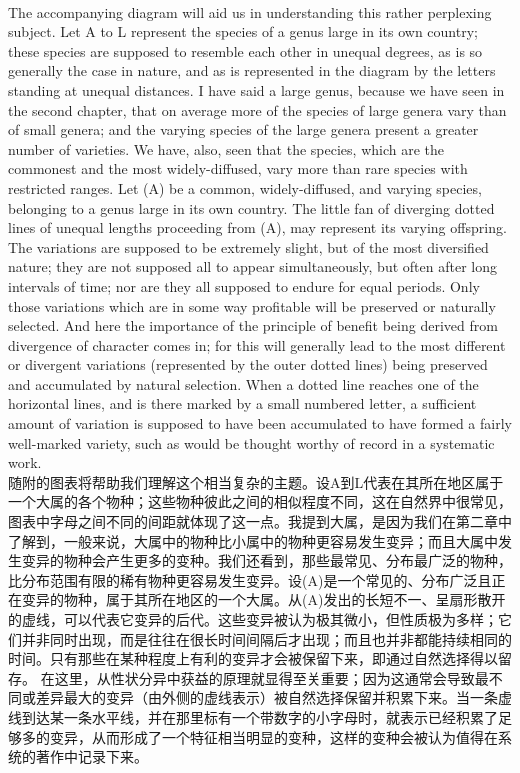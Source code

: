 \documentclass{article}
\begin{document}
\\
The accompanying diagram will aid us in understanding this rather perplexing subject. Let A to L represent the species of a genus large in its own country; these species are supposed to resemble each other in unequal degrees, as is so generally the case in nature, and as is represented in the diagram by the letters standing at unequal distances. I have said a large genus, because we have seen in the second chapter, that on average more of the species of large genera vary than of small genera; and the varying species of the large genera present a greater number of varieties. We have, also, seen that the species, which are the commonest and the most widely-diffused, vary more than rare species with restricted ranges. Let (A) be a common, widely-diffused, and varying species, belonging to a genus large in its own country. The little fan of diverging dotted lines of unequal lengths proceeding from (A), may represent its varying offspring. The variations are supposed to be extremely slight, but of the most diversified nature; they are not supposed all to appear simultaneously, but often after long intervals of time; nor are they all supposed to endure for equal periods. Only those variations which are in some way profitable will be preserved or naturally selected. And here the importance of the principle of benefit being derived from divergence of character comes in; for this will generally lead to the most different or divergent variations (represented by the outer dotted lines) being preserved and accumulated by natural selection. When a dotted line reaches one of the horizontal lines, and is there marked by a small numbered letter, a sufficient amount of variation is supposed to have been accumulated to have formed a fairly well-marked variety, such as would be thought worthy of record in a systematic work.\\
 随附的图表将帮助我们理解这个相当复杂的主题。设A到L代表在其所在地区属于一个大属的各个物种；这些物种彼此之间的相似程度不同，这在自然界中很常见，图表中字母之间不同的间距就体现了这一点。我提到大属，是因为我们在第二章中了解到，一般来说，大属中的物种比小属中的物种更容易发生变异；而且大属中发生变异的物种会产生更多的变种。我们还看到，那些最常见、分布最广泛的物种，比分布范围有限的稀有物种更容易发生变异。设(A)是一个常见的、分布广泛且正在变异的物种，属于其所在地区的一个大属。从(A)发出的长短不一、呈扇形散开的虚线，可以代表它变异的后代。这些变异被认为极其微小，但性质极为多样；它们并非同时出现，而是往往在很长时间间隔后才出现；而且也并非都能持续相同的时间。只有那些在某种程度上有利的变异才会被保留下来，即通过自然选择得以留存。 在这里，从性状分异中获益的原理就显得至关重要；因为这通常会导致最不同或差异最大的变异（由外侧的虚线表示）被自然选择保留并积累下来。当一条虚线到达某一条水平线，并在那里标有一个带数字的小字母时，就表示已经积累了足够多的变异，从而形成了一个特征相当明显的变种，这样的变种会被认为值得在系统的著作中记录下来。 \\
\end{document}
